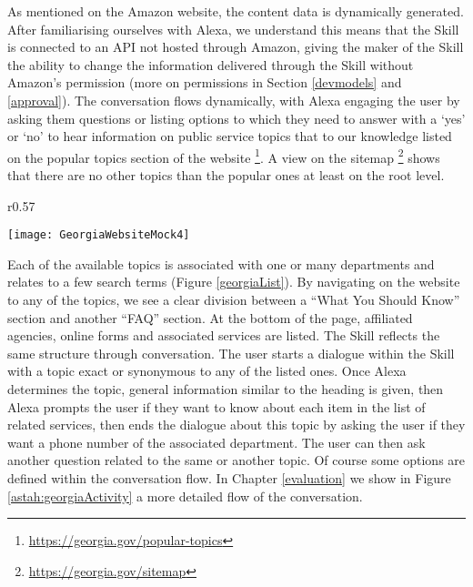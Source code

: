 As mentioned on the Amazon website, the content data is dynamically generated. After familiarising ourselves with Alexa, we understand this means that the Skill is connected to an API not hosted through Amazon, giving the maker of the Skill the ability to change the information delivered through the Skill without Amazon's permission (more on permissions in Section \ref{devmodels} and \ref{approval}). The conversation flows dynamically, with Alexa engaging the user by asking them questions or listing options to which they need to answer with a `yes' or `no' to hear information on public service topics that to our knowledge listed on the popular topics section of the website \footnote{\url{https://georgia.gov/popular-topics}}. A view on the sitemap \footnote{\url{https://georgia.gov/sitemap}} shows that there are no other topics than the popular ones at least on the root level.





\begin{wrapfigure}{r}{0.57\textwidth}
	\begin{center}	
	\caption[Georgia.gov Popular Topics]{Georgia.gov Popular Topics - Based on \href{https://georgia.gov/popular-topics}{georgia.gov/popular-topics}}
	\label{georgiaList}
	\centering
	\texttt{[image: GeorgiaWebsiteMock4]}
	\end{center}
\end{wrapfigure}




Each of the available topics is associated with one or many departments and relates to a few search terms (Figure \ref{georgiaList}). By navigating on the website to any of the topics, we see a clear division between a ``What You Should Know'' section and another ``FAQ'' section. At the bottom of the page, affiliated agencies, online forms and associated services are listed. The Skill reflects the same structure through conversation. The user starts a dialogue within the Skill with a topic exact or synonymous to any of the listed ones. Once Alexa determines the topic, general information similar to the heading is given, then Alexa prompts the user if they want to know about each item in the list of related services, then ends the dialogue about this topic by asking the user if they want a phone number of the associated department. The user can then ask another question related to the same or another topic. Of course some options are defined within the conversation flow. In Chapter \ref{evaluation} we show in Figure \ref{astah:georgiaActivity} a more detailed flow of the conversation.

















